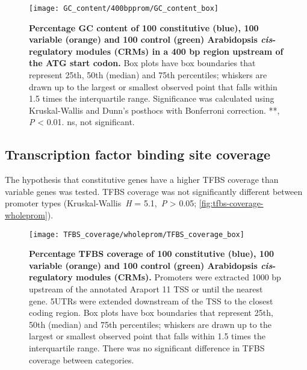 \documentclass[../main.tex]{subfiles}
\begin{document}
\begin{figure}[hbt!]
	\begin{center}
		\capstart
		\texttt{[image: GC\_content/400bpprom/GC\_content\_box]}
		\caption{
			\textbf{Percentage GC content of 100 constitutive (blue), 100 variable (orange) and 100 control (green) Arabidopsis \textit{cis}\hyp{}regulatory modules (CRMs) in a 400 bp region upstream of the ATG start codon.}
			Box plots have box boundaries that represent 25th, 50th (median) and 75th percentiles; whiskers are drawn up to the largest or smallest observed point that falls within 1.5 times the interquartile range.
			Significance was calculated using Kruskal\hyp{}Wallis and Dunn's posthocs with Bonferroni correction.
			**, \textit{P} \textless{} 0.01. ns, not significant.
			\label{fig:gc-content-400bpprom}
		}
	\end{center}
\end{figure}




\subsection{Transcription factor binding site coverage}
The hypothesis that constitutive genes have a higher TFBS coverage than variable genes was tested.
TFBS coverage was not significantly different between promoter types (Kruskal\hyp{}Wallis~\textit{H} = 5.1,~\textit{P} \textgreater{} 0.05; \autoref{fig:tfbs-coverage-wholeprom}).

\begin{figure}[hbt!]
	\begin{center}
		\capstart
		\texttt{[image: TFBS\_coverage/wholeprom/TFBS\_coverage\_box]}
		\caption{
			\textbf{Percentage TFBS coverage of 100 constitutive (blue), 100 variable (orange) and 100 control (green) Arabidopsis \textit{cis}\hyp{}regulatory modules (CRMs).}
			Promoters were extracted 1000 bp upstream of the annotated Araport 11 \autocite{chengAraport11CompleteReannotation2017} TSS or until the nearest gene.
			5UTRs were extended downstream of the TSS to the closest coding region.  Box plots have box boundaries that represent 25th, 50th (median) and 75th percentiles; whiskers are drawn up to the largest or smallest observed point that falls within 1.5 times the interquartile range.
			There was no significant difference in TFBS coverage between categories.
			\label{fig:tfbs-coverage-wholeprom}
		}
	\end{center}
\end{figure}
\end{document}
